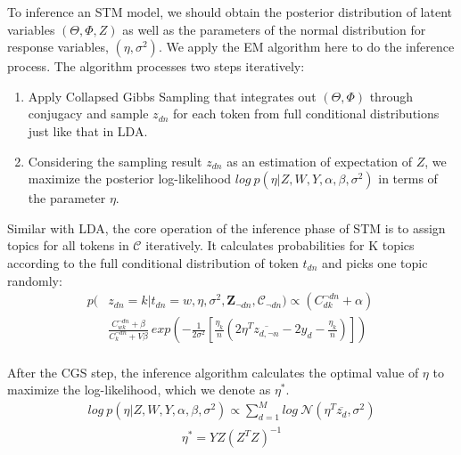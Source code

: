 \documentclass[10pt,journal,cspaper,compsoc]{IEEEtran}
\begin{document}
To inference an STM model, we should obtain the posterior
distribution of latent variables $(\Theta, \Phi, Z)$ as well as
the parameters of the normal distribution for response variables, $(\eta, \sigma^2)$. We apply the EM algorithm here
to do the inference process. The algorithm processes two steps
iteratively:
\begin{enumerate}
    \item Apply Collapsed Gibbs Sampling that integrates out $(\Theta, \Phi)$ 
    through conjugacy and sample  $z_{dn}$ for each token from 
    full conditional distributions just like that in LDA.
    \item Considering the sampling result $z_{dn}$ as an estimation of expectation of $Z$, we maximize the posterior log-likelihood $log~p(\eta|Z,W,Y,\alpha,\beta, \sigma^2)$ in terms of the parameter $\eta$.
\end{enumerate}
Similar with LDA, the core operation of the inference phase of STM is 
to assign topics for all tokens in $\mathcal{C}$ iteratively. It calculates probabilities for K topics according to the full conditional distribution of token $t_{dn}$ and picks one topic randomly:
\begin{align*}
\label{eq:slda_sampling}
p(&z_{dn} = k| t_{dn} = w, \eta, \sigma^2, \mathbf{Z}_{\neg dn}, \mathcal{C}_{\neg dn}) \propto
(C_{dk}^{\neg dn} + \alpha) ~ \\
&\frac{C_{wk}^{\neg dn} + \beta}{C_{k}^{\neg dn} + V\beta} ~
exp({-\frac{1}{2\sigma^2}
[\frac{\eta_k}{n}(2\eta^T\overline{z_{d,\neg n}}-2y_d-\frac{\eta_k}{n})]})
\end{align*}
\\
After the CGS step, the inference algorithm calculates the optimal value of $\eta$ to maximize the log-likelihood, which we denote as $\eta^*$.
\begin{align*}
\label{eq:slda_estimating}
log~p(\eta|Z,W,Y,\alpha,\beta, \sigma^2) \propto \sum_{d=1}^{M}{log~\mathcal{N}(\eta^T\overline{z_d}, \sigma^2)}
\end{align*}
\begin{align*}
\label{eq:slda_solution}
\eta^* = YZ(Z^TZ)^{-1}
\end{align*}
\end{document}
